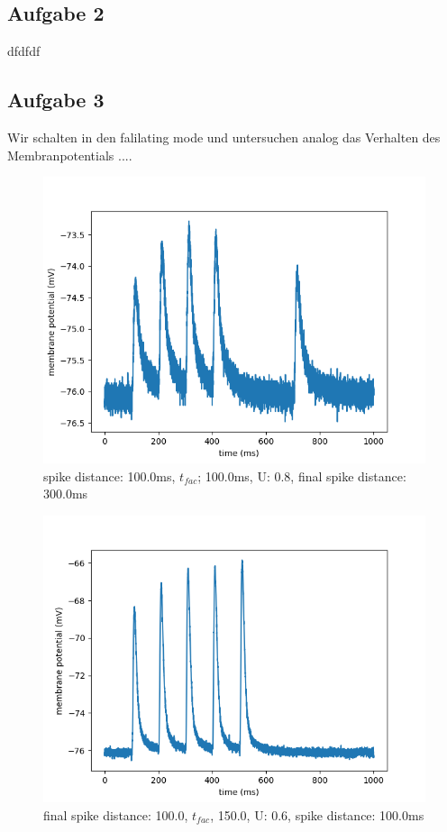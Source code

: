 \documentclass[10pt,a4paper]{scrartcl}
\begin{document}
\subsection{Aufgabe 2}
dfdfdf


\subsection{Aufgabe 3}
Wir schalten in den falilating mode und untersuchen analog das Verhalten des Membranpotentials ....


\begin{figure} [ht]
\begin{center}
\label{fig:abb23}
\caption{spike distance: 100.0ms, $t_{fac}$; 100.0ms, U: 0.8, final spike distance: 300.0ms}
\includegraphics[scale=0.35]{pictures/final_spike_variation_13.pdf} 
\end{center}
\end{figure}

\begin{figure} [ht]
\begin{center}
\label{fig:abb24}
\caption{final spike distance: 100.0, $t_{fac}$, 150.0, U: 0.6, spike distance: 100.0ms}
\includegraphics[scale=0.35]{pictures/final_spike_variation_14.pdf} 
\end{center}
\end{figure}
\end{document}
